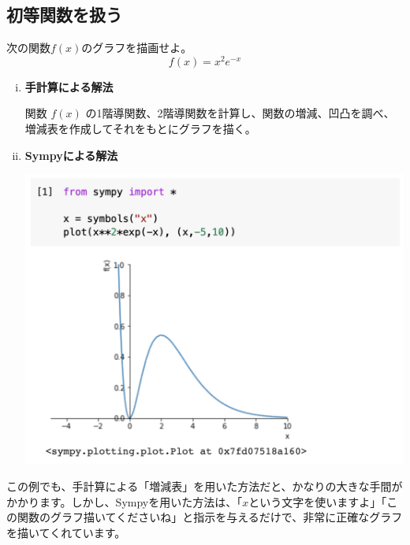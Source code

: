 \documentclass[10pt, a5paper,dvipdfmx]{jsbook}
\begin{document}
\subsection{初等関数を扱う}
\begin{framed}
\begin{exq}
次の関数$f(x)$のグラフを描画せよ。
\Large
$$f(x) = x^2e^{-x}$$
\normalsize
\end{exq}
\end{framed}
\begin{enumerate}[(i)]
    \item 
    {\bf 手計算による解法}
    
関数
\large
$f(x)$
\normalsize
の1階導関数、2階導関数を計算し、関数の増減、凹凸を調べ、増減表を作成してそれをもとにグラフを描く。\\
    \item
    {\bf Sympyによる解法}
    \begin{center}
    \includegraphics[scale=0.5]{fig1-2-2.png}
    \end{center}    
\end{enumerate}
この例でも、手計算による「増減表」を用いた方法だと、かなりの大きな手間がかかります。しかし、Sympyを用いた方法は、「$x$という文字を使いますよ」「この関数のグラフ描いてくださいね」と指示を与えるだけで、非常に正確なグラフを描いてくれています。
\end{document}
